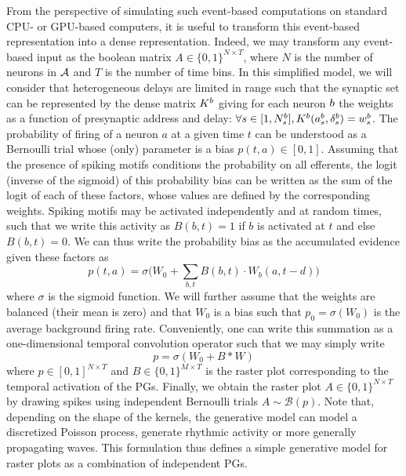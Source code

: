 \documentclass[default]{sn-jnl}%
\theoremstyle{thmstyleone}%
\theoremstyle{thmstyletwo}%
\theoremstyle{thmstylethree}%
\begin{document}
From the perspective of simulating such event-based computations on standard CPU- or GPU-based computers, it is useful to transform this event-based representation into a dense representation. Indeed, we may transform any event-based input as the boolean matrix $A \in \{0, 1 \}^{N\times T}$, where $N$ is the number of neurons in $\mathcal{A}$ and $T$ is the number of time bins. In this simplified model, we will consider that heterogeneous delays are limited in range such that the synaptic set can be represented by the dense matrix $K^b$ giving for each neuron $b$ the weights as a function of presynaptic address and delay: $\forall {s\in [1,N_{s}^b]}, K^b(a_s^b, \delta_s^b) = w_s^b$. 
The probability of firing of a neuron $a$ at a given time $t$ can be understood as a Bernoulli trial whose (only) parameter is a bias $p(t, a) \in [0, 1]$. Assuming that the presence of spiking motifs conditions the probability on all efferents, the logit (inverse of the sigmoid) of this probability bias can be written as the sum of the logit of each of these factors, whose values are defined by the corresponding weights. Spiking motifs may be activated independently and at random times, such that  we write this activity as $B(b, t)=1$ if $b$ is activated at $t$ and else $B(b, t)=0$. We can thus write the probability bias as the accumulated evidence given these factors as 
\begin{equation*}
p(t, a) = \sigma\big(W_0 + \sum_{b, t} B(b, t) \cdot W_b(a, t-d) \big)  
\end{equation*}
where $\sigma$ is the sigmoid function. We will further assume that the weights are balanced (their mean is zero) and that $W_0$ is a bias such that $p_0=\sigma(W_0)$ is the average background firing rate. Conveniently, one can write this summation as a one-dimensional temporal convolution operator such that we may simply write
\begin{equation*}
p = \sigma(W_0 + B \ast W )
\end{equation*}
where  $p\in [ 0, 1]^{N\times T}$ and $B\in \{0, 1\}^{M\times T}$ is the raster plot corresponding to the temporal activation of the PGs. Finally, we obtain the raster plot $A\in \{0, 1\}^{N\times T}$ by drawing spikes using independent Bernoulli trials $A \sim \mathcal{B}(p)$. Note that, depending on the shape of the kernels, the generative model can model a discretized Poisson process, generate rhythmic activity or more generally propagating waves. This formulation thus defines a simple generative model for raster plots as a combination of independent PGs. 
\end{document}
